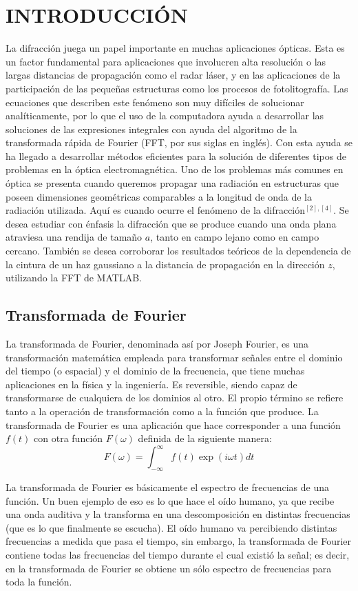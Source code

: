 \documentclass[11pt,letterpaper,twocolumn]{article}
\begin{document}
\section*{\normalsize{INTRODUCCIÓN}} 
La difracción juega un papel importante en muchas aplicaciones ópticas. Esta es un factor fundamental para aplicaciones que involucren alta resolución o las largas distancias de propagación como el radar láser,
y en las aplicaciones de la participación de las pequeñas estructuras como los procesos de fotolitografía. Las ecuaciones que describen este fenómeno son muy difíciles de solucionar analíticamente, por lo que el uso de la computadora ayuda a desarrollar las soluciones de las expresiones integrales con ayuda del algoritmo de la transformada rápida de Fourier (FFT, por sus siglas en inglés). Con esta ayuda se ha llegado a desarrollar métodos eficientes para la solución de diferentes tipos de problemas en la óptica electromagnética. Uno de los problemas
más comunes en óptica se presenta cuando queremos propagar una radiación en estructuras que poseen dimensiones geométricas comparables a la longitud de onda de la radiación utilizada. Aquí es cuando ocurre el fenómeno de la difracción$^{[2],[4]}$. Se desea estudiar con énfasis la difracción que se produce cuando una onda plana atraviesa una rendija de tamaño $a$, tanto en campo lejano como en campo cercano. También se desea corroborar los resultados teóricos de la dependencia de la cintura de un haz gaussiano a la distancia de propagación en la dirección $z$, utilizando la FFT de MATLAB. 
\subsection*{Transformada de Fourier}
La transformada de Fourier, denominada así por Joseph Fourier, es una transformación matemática empleada para transformar señales entre el dominio del tiempo (o espacial) y el dominio de la frecuencia, que tiene muchas aplicaciones en la física y la ingeniería. Es reversible, siendo capaz de transformarse de cualquiera de los dominios al otro. El propio término se refiere tanto a la operación de transformación como a la función que produce. La transformada de Fourier es una aplicación que hace corresponder a una función $f(t)$ con otra función $F(\omega)$ definida de la siguiente manera:\\
$$F(\omega)= \int_{-\infty}^{\infty} f(t) \exp(i \omega t)dt$$
\par 
La transformada de Fourier es básicamente el espectro de frecuencias de una función. Un buen ejemplo de eso es lo que hace el oído humano, ya que recibe una onda auditiva y la transforma en una descomposición en distintas frecuencias (que es lo que finalmente se escucha). El oído humano va percibiendo distintas frecuencias a medida que pasa el tiempo, sin embargo, la transformada de Fourier contiene todas las frecuencias del tiempo durante el cual existió la señal; es decir, en la transformada de Fourier se obtiene un sólo espectro de frecuencias para toda la función.
\end{document}
